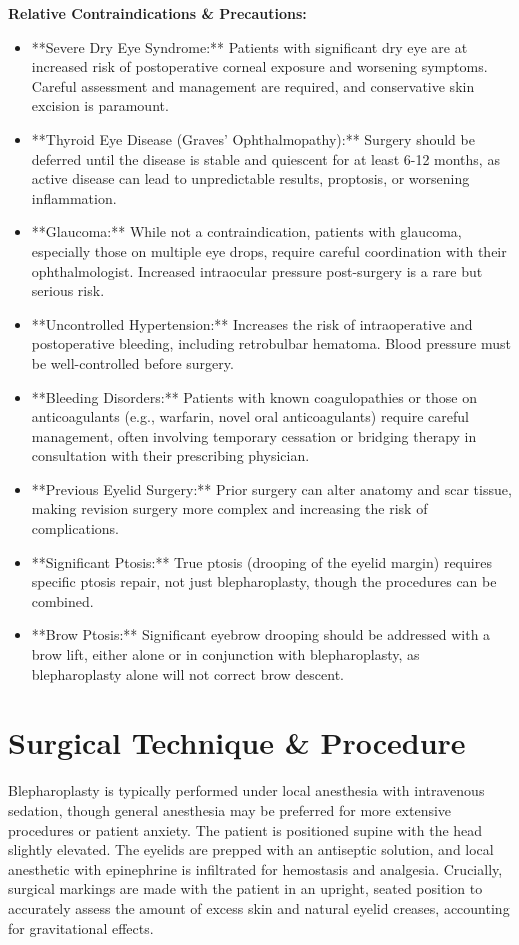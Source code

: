 \textbf{Relative Contraindications \& Precautions:}
\begin{itemize}
  \item **Severe Dry Eye Syndrome:** Patients with significant dry eye are at increased risk of postoperative corneal exposure and worsening symptoms. Careful assessment and management are required, and conservative skin excision is paramount.
  \item **Thyroid Eye Disease (Graves' Ophthalmopathy):** Surgery should be deferred until the disease is stable and quiescent for at least 6-12 months, as active disease can lead to unpredictable results, proptosis, or worsening inflammation.
  \item **Glaucoma:** While not a contraindication, patients with glaucoma, especially those on multiple eye drops, require careful coordination with their ophthalmologist. Increased intraocular pressure post-surgery is a rare but serious risk.
  \item **Uncontrolled Hypertension:** Increases the risk of intraoperative and postoperative bleeding, including retrobulbar hematoma. Blood pressure must be well-controlled before surgery.
  \item **Bleeding Disorders:** Patients with known coagulopathies or those on anticoagulants (e.g., warfarin, novel oral anticoagulants) require careful management, often involving temporary cessation or bridging therapy in consultation with their prescribing physician.
  \item **Previous Eyelid Surgery:** Prior surgery can alter anatomy and scar tissue, making revision surgery more complex and increasing the risk of complications.
  \item **Significant Ptosis:** True ptosis (drooping of the eyelid margin) requires specific ptosis repair, not just blepharoplasty, though the procedures can be combined.
  \item **Brow Ptosis:** Significant eyebrow drooping should be addressed with a brow lift, either alone or in conjunction with blepharoplasty, as blepharoplasty alone will not correct brow descent.
\end{itemize}

\section*{Surgical Technique \& Procedure}
Blepharoplasty is typically performed under local anesthesia with intravenous sedation, though general anesthesia may be preferred for more extensive procedures or patient anxiety. The patient is positioned supine with the head slightly elevated. The eyelids are prepped with an antiseptic solution, and local anesthetic with epinephrine is infiltrated for hemostasis and analgesia. Crucially, surgical markings are made with the patient in an upright, seated position to accurately assess the amount of excess skin and natural eyelid creases, accounting for gravitational effects.

